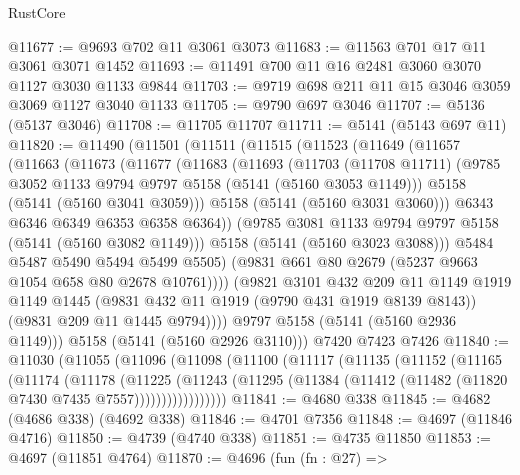 \begin{lexlean}{RustCore}
\begin{coremodule}
@11677 := @9693 @702 @11 @3061 @3073
@11683 := @11563 @701 @17 @11 @3061 @3071 @1452
@11693 := @11491 @700 @11 @16 @2481 @3060 @3070 @1127 @3030 @1133 @9844
@11703 := @9719 @698 @211 @11 @15 @3046 @3059 @3069 @1127 @3040 @1133
@11705 := @9790 @697 @3046
@11707 := @5136 (@5137 @3046)
@11708 := @11705 @11707
@11711 := @5141 (@5143 @697 @11)
@11820 := @11490
    (@11501
      (@11511
        (@11515
          (@11523
            (@11649
              (@11657
                (@11663
                  (@11673
                    (@11677
                      (@11683
                        (@11693
                          (@11703
                            (@11708 @11711)
                            (@9785 @3052 @1133 @9794 @9797 @5158 (@5141 (@5160 @3053 @1149)))
                            @5158
                            (@5141 (@5160 @3041 @3059)))
                          @5158
                          (@5141 (@5160 @3031 @3060)))
                        @6343
                        @6346
                        @6349
                        @6353
                        @6358
                        @6364))
                    (@9785 @3081 @1133 @9794 @9797 @5158 (@5141 (@5160 @3082 @1149)))
                    @5158
                    (@5141 (@5160 @3023 @3088)))
                  @5484
                  @5487
                  @5490
                  @5494
                  @5499
                  @5505)
                (@9831 @661 @80 @2679 (@5237 @9663 @1054 @658 @80 @2678 @10761))))
            (@9821
              @3101
              @432
              @209
              @11
              @1149
              @1919
              @1149
              @1445
              (@9831 @432 @11 @1919 (@9790 @431 @1919 @8139 @8143))
              (@9831 @209 @11 @1445 @9794))))
        @9797
        @5158
        (@5141 (@5160 @2936 @1149)))
      @5158
      (@5141 (@5160 @2926 @3110)))
    @7420
    @7423
    @7426
@11840 := @11030
    (@11055
      (@11096
        (@11098
          (@11100
            (@11117
              (@11135
                (@11152
                  (@11165
                    (@11174
                      (@11178
                        (@11225
                          (@11243
                            (@11295
                              (@11384 (@11412 (@11482 (@11820 @7430 @7435 @7557)))))))))))))))))
@11841 := @4680 @338
@11845 := @4682 (@4686 @338) (@4692 @338)
@11846 := @4701 @7356
@11848 := @4697 (@11846 @4716)
@11850 := @4739 (@4740 @338)
@11851 := @4735 @11850
@11853 := @4697 (@11851 @4764)
@11870 := @4696
    (fun (fn : @27) =>

\end{coremodule}
\end{lexlean}
